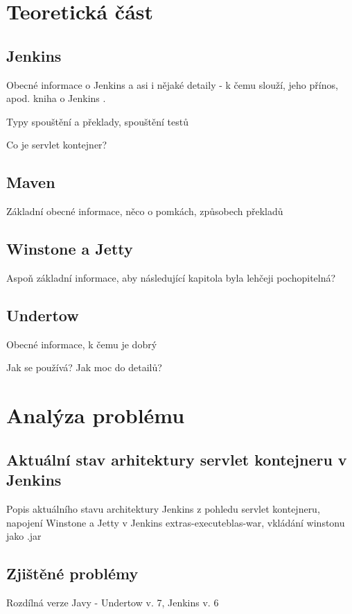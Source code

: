 \chapter{Teoretická část}
    \section {Jenkins}
        Obecné informace o Jenkins a asi i nějaké detaily - k čemu slouží, jeho přínos, apod.
        kniha o Jenkins \cite{JenkinsBook}.
        
        Typy spouštění a překlady, spouštění testů

        Co je servlet kontejner?

    \section{Maven}
        Základní obecné informace, něco o pomkách, způsobech překladů

    \section{Winstone a Jetty}
        Aspoň základní informace, aby následující kapitola byla lehčeji pochopitelná?

    \section{Undertow}
        Obecné informace, k čemu je dobrý

        Jak se používá? Jak moc do detailů?

        


\chapter{Analýza problému}
    
    \section{Aktuální stav arhitektury servlet kontejneru v Jenkins}
        Popis aktuálního stavu architektury Jenkins z pohledu servlet kontejneru, napojení Winstone a Jetty v Jenkins
        extras-executeblas-war, vkládání winstonu jako .jar

    \section{Zjištěné problémy}
        Rozdílná verze Javy - Undertow v. 7, Jenkins v. 6
        
